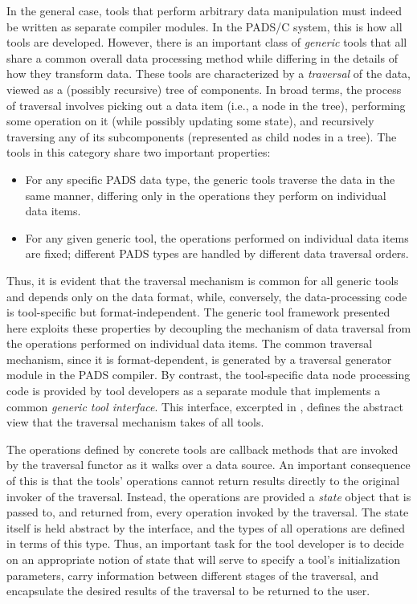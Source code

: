 In the general case, tools that perform arbitrary data manipulation must indeed be written as separate compiler modules. In the PADS/C system, this is how all tools are developed. However, there is an important class of \emph{generic} tools that all share a common overall data processing method while differing in the details of how they transform data. These tools are characterized by a \emph{traversal} of the data, viewed as a (possibly recursive) tree of components. In broad terms, the process of traversal involves picking out a data item (i.e., a node in the tree), performing some operation on it (while possibly updating some state), and recursively traversing any of its subcomponents (represented as child nodes in a tree). The tools in this category share two important properties:
\begin{itemize}
\item For any specific PADS data type, the generic tools traverse the data in the same manner, differing only in the operations they perform on individual data items.
\item For any given generic tool, the operations performed on individual data items are fixed; different PADS types are handled by different data traversal orders.
\end{itemize}

Thus, it is evident that the traversal mechanism is common for all generic tools and depends only on the data format, while, conversely, the data-processing code is tool-specific but format-independent. The generic tool framework presented here exploits these properties by decoupling the mechanism of data traversal from the operations performed on individual data items. The common traversal mechanism, since it is format-dependent, is generated by a traversal generator module in the PADS compiler. By contrast, the tool-specific data node processing code is provided by tool developers as a separate module that implements a common \emph{generic tool interface}. This interface, excerpted in , defines the abstract view that the traversal mechanism takes of all tools.

The operations defined by concrete tools are callback methods that are invoked by the traversal functor as it walks over a data source. An important consequence of this is that the tools' operations cannot return results directly to the original invoker of the traversal. Instead, the operations are provided a \emph{state} object that is passed to, and returned from, every operation invoked by the traversal. The state itself is held abstract by the interface, and the types of all operations are defined in terms of this type. Thus, an important task for the tool developer is to decide on an appropriate notion of state that will serve to specify a tool's initialization parameters, carry information between different stages of the traversal, and encapsulate the desired results of the traversal to be returned to the user.

